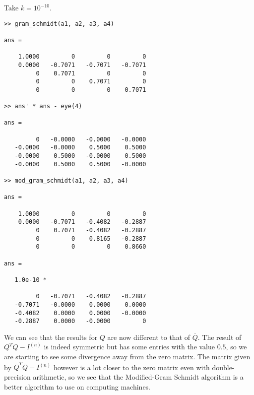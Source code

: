 \documentclass{article}
\begin{document}
\begin{enumerate}
\begin{enumerate}
		\newpage
		Take $k = 10^{-10}$.
		\begin{verbatim}
>> gram_schmidt(a1, a2, a3, a4)

ans =

    1.0000         0         0         0
    0.0000   -0.7071   -0.7071   -0.7071
         0    0.7071         0         0
         0         0    0.7071         0
         0         0         0    0.7071
         
>> ans' * ans - eye(4)

ans =

         0   -0.0000   -0.0000   -0.0000
   -0.0000   -0.0000    0.5000    0.5000
   -0.0000    0.5000   -0.0000    0.5000
   -0.0000    0.5000    0.5000   -0.0000
   
>> mod_gram_schmidt(a1, a2, a3, a4)

ans =

    1.0000         0         0         0
    0.0000   -0.7071   -0.4082   -0.2887
         0    0.7071   -0.4082   -0.2887
         0         0    0.8165   -0.2887
         0         0         0    0.8660
      
ans =

   1.0e-10 *

         0   -0.7071   -0.4082   -0.2887
   -0.7071   -0.0000    0.0000    0.0000
   -0.4082    0.0000    0.0000   -0.0000
   -0.2887    0.0000   -0.0000         0
		\end{verbatim}
		We can see that the results for $Q$ are now different to that of $\overline{Q}$. The result of $Q^TQ - I^{(n)}$ is indeed symmetric but has some entries with the value $0.5$, so we are starting to see some divergence away from the zero matrix. The matrix given by $\overline{Q}^T\overline{Q} - I^{(n)}$ however is a lot closer to the zero matrix even with double-precision arithmetic, so we see that the Modified-Gram Schmidt algorithm is a better algorithm to use on computing machines.
		
	\end{enumerate}
\end{enumerate}
\end{document}
